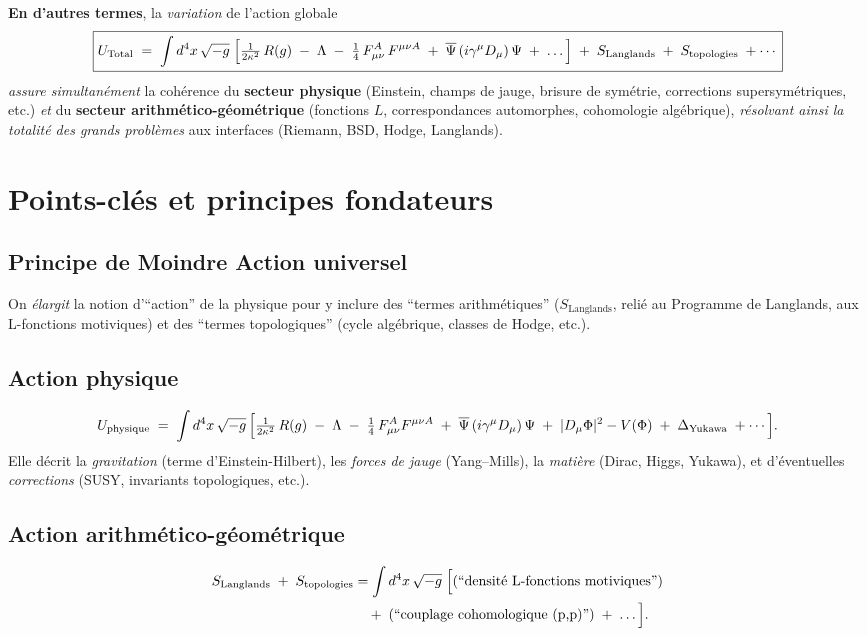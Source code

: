 \documentclass[11pt]{article}
\begin{document}
\noindent
\textbf{En d'autres termes}, la \emph{variation} de l'action globale
\[
\boxed{
U_{\mathrm{Total}}
\;=\;
\int d^4x\,\sqrt{-g}\;\Bigl[
\tfrac{1}{2\kappa^2}\,R(g)
\;-\;\Lambda
\;-\;\tfrac14\,F_{\mu\nu}^A\,F^{\mu\nu A}
\;+\;\overline{\Psi}\,(i\gamma^\mu D_\mu)\,\Psi
\;+\;\dots
\Bigr]
\;+\;
S_{\mathrm{Langlands}}
\;+\;
S_{\text{topologies}}
\;+\cdots
}
\]
\emph{assure simultanément} la cohérence du \textbf{secteur physique} (Einstein, champs de jauge, brisure de symétrie, corrections supersymétriques, etc.) \emph{et} du \textbf{secteur arithmético-géométrique} (fonctions $L$, correspondances automorphes, cohomologie algébrique), \emph{résolvant ainsi la totalité des grands problèmes} aux interfaces (Riemann, BSD, Hodge, Langlands).

\section{Points-clés et principes fondateurs}

\subsection{Principe de Moindre Action universel}
On \emph{élargit} la notion d'“action” de la physique pour y inclure des “termes arithmétiques” (\(S_{\mathrm{Langlands}}\), relié au Programme de Langlands, aux L-fonctions motiviques) et des “termes topologiques” (cycle algébrique, classes de Hodge, etc.). 

\subsection{Action physique}
\[
  U_{\mathrm{physique}}
  \;=\;
  \int d^4x\,\sqrt{-g}\,\Bigl[
    \tfrac{1}{2\kappa^2}\,R(g)
    \;-\;\Lambda
    \;-\;\tfrac14\,F_{\mu\nu}^A F^{\mu\nu A}
    \;+\;\overline{\Psi}\,(i\gamma^\mu D_\mu)\,\Psi
    \;+\;|D_\mu\Phi|^2 - V(\Phi)
    \;+\;\Delta_{\mathrm{Yukawa}}
    \;+\cdots
  \Bigr].
\]
Elle décrit la \emph{gravitation} (terme d'Einstein-Hilbert), les \emph{forces de jauge} (Yang--Mills), la \emph{matière} (Dirac, Higgs, Yukawa), et d'éventuelles \emph{corrections} (SUSY, invariants topologiques, etc.).

\subsection{Action arithmético-géométrique}
\begin{equation}
\begin{aligned}
  S_{\mathrm{Langlands}}
  \;+\;
  S_{\text{topologies}}
  &=
  \int d^4x\,\sqrt{-g}\;\Bigl[
    \text{(“densité L-fonctions motiviques”)}
    \notag \\
  &\quad
    +\;\text{(“couplage cohomologique (p,p)”)}
    \;+\;\dots
  \Bigr].
\end{aligned}
\end{equation}
\end{document}
